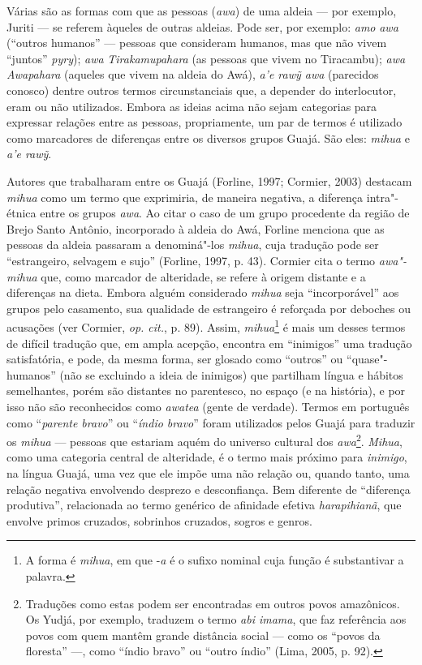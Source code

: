 Várias são as formas com que as pessoas (\emph{awa}) de uma aldeia --- por
exemplo, Juriti --- se referem àqueles de outras aldeias. Pode ser, por
exemplo: \emph{amo} \emph{awa} (``outros humanos'' --- pessoas que
consideram humanos, mas que não vivem ``juntos'' \emph{pyry}); \emph{awa}
\emph{Tirakamupahara} (as pessoas que vivem no  Tiracambu); \emph{awa
Awapahara} (aqueles que vivem na aldeia do  Awá), \emph{a'e rawỹ awa}
(parecidos conosco) dentre outros termos circunstanciais que, a depender
do interlocutor, eram ou não utilizados. Embora as ideias acima não
sejam categorias para expressar relações entre as pessoas, propriamente,
um par de termos é utilizado como marcadores de diferenças entre os
diversos grupos Guajá. São eles: \emph{mihua} e \emph{a'e rawỹ}.

Autores que trabalharam entre os Guajá (Forline, 1997; Cormier, 2003)
destacam \emph{mihua} como um termo que exprimiria, de maneira negativa,
a diferença intra"-étnica entre os grupos \emph{awa}. Ao citar o caso de
um grupo procedente da região de Brejo Santo Antônio, incorporado à
aldeia do  Awá, Forline menciona que as pessoas da aldeia passaram a
denominá"-los \emph{mihua}, cuja tradução pode ser ``estrangeiro, selvagem
e sujo'' (Forline, 1997, p. 43). Cormier cita o termo \emph{awa"-mihua}
que, como marcador de alteridade, se refere à origem distante e a
diferenças na dieta. Embora alguém considerado \emph{mihua} seja
``incorporável'' aos grupos pelo casamento, sua qualidade de estrangeiro é
reforçada por deboches ou acusações (ver Cormier, \emph{op. cit.}, p. 89).
Assim, \emph{mihua}\footnote{A forma é \emph{mihua}, em que -\emph{a} é
  o sufixo nominal cuja função é substantivar a palavra.} é mais um
desses termos de difícil tradução que, em ampla acepção, encontra em
``inimigos'' uma tradução satisfatória, e pode, da mesma forma, ser
glosado como ``outros'' ou ``quase"-humanos'' (não se excluindo a ideia
de inimigos) que partilham língua e hábitos semelhantes, porém são
distantes no parentesco, no espaço (e na história), e por isso não são
reconhecidos como \emph{awatea} (gente de verdade). Termos em português
como ``\emph{parente bravo}'' ou ``\emph{índio bravo}'' foram utilizados
pelos Guajá para traduzir os \emph{mihua} --- pessoas que estariam aquém
do universo cultural dos \emph{awa}\footnote{Traduções como estas podem
  ser encontradas em outros povos amazônicos. Os Yudjá, por exemplo,
  traduzem o termo \emph{abi imama}, que faz referência aos povos com
  quem mantêm grande distância social --- como os ``povos da floresta'' ---,
  como ``índio bravo'' ou ``outro índio'' (Lima, 2005, p. 92).}. \emph{Mihua},
como uma categoria central de alteridade, é o termo mais próximo para
\emph{inimigo}, na língua Guajá, uma vez que ele impõe uma não relação
ou, quando tanto, uma relação negativa envolvendo desprezo e
desconfiança. Bem diferente de ``diferença produtiva'', relacionada ao
termo genérico de afinidade efetiva \emph{harapihianã}, que envolve
primos cruzados, sobrinhos cruzados, sogros e genros.

